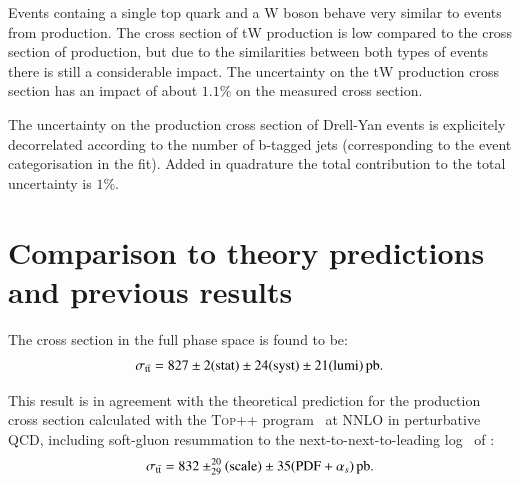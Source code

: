 

Events containg a single top quark and a W boson behave very similar to events from \ttbar production. The cross section of tW production is low compared to the cross section of \ttbar production, but due to the similarities between
both types of events there is still a considerable impact. The uncertainty on the tW production cross section has an impact of about $1.1 \%$ on the measured \ttbar cross section.

The uncertainty on the production cross section of Drell-Yan events is explicitely decorrelated according to the number of b-tagged jets (corresponding to the event categorisation in the fit).
Added in quadrature the total contribution to the total uncertainty is $1\%$.


\section{Comparison to theory predictions and previous results}
\label{sec:results_comp}

The cross section in the full phase space is found to be:
\begin{equation}
\sigma_\mathrm{t\bar{t}}  =  827 \pm 2 ({\rm stat}) \pm 24 ({\rm syst}) \pm 21 ({\rm lumi}) \mbox{\ensuremath{\,\text{pb}}}.
\end{equation}
 
This result is in agreement with the theoretical prediction for the \ttbar production cross section calculated with the \textsc{Top++} program~\cite{Czakon:2011xx} at NNLO in perturbative QCD, including soft-gluon resummation to the next-to-next-to-leading log~\cite{Andreev:2017vxu} of :
\begin{equation}
\sigma_\mathrm{t\bar{t}} =  832 \pm^{20}_{29} {\rm (scale)} \pm 35({\rm PDF}+\alpha_s) \mbox{\ensuremath{\,\text{pb}}}.
\end{equation}

